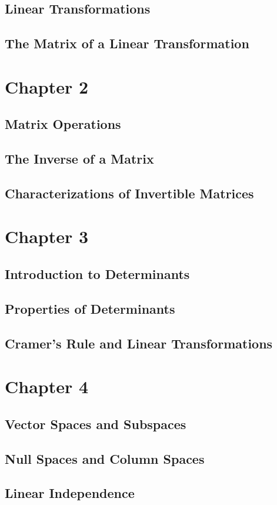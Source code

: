 \documentclass{article}
\begin{document}
\subsection{Linear Transformations}
\subsection{The Matrix of a Linear Transformation}
\section{Chapter 2}
\subsection{Matrix Operations}
\subsection{The Inverse of a Matrix}
\subsection{Characterizations of Invertible Matrices}
\section{Chapter 3}
\subsection{Introduction to Determinants}
\subsection{Properties of Determinants}
\subsection{Cramer's Rule and Linear Transformations}
\section{Chapter 4}
\subsection{Vector Spaces and Subspaces}
\subsection{Null Spaces and Column Spaces}
\subsection{Linear Independence}
\end{document}
